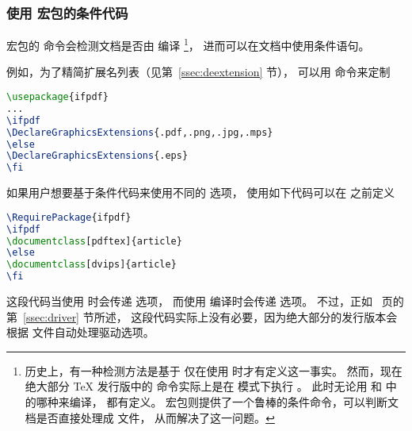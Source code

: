 \subsubsection{使用  宏包的条件代码}
 宏包的  命令会检测文档是否由  编译
\footnote{
	历史上，有一种检测方法是基于  仅在使用 \pdfLaTeX{} 时才有定义这一事实。
	然而，现在绝大部分 \TeX{} 发行版中的  命令实际上是在  模式下执行 \pdfLaTeX{}。
	此时无论用 和  中的哪种来编译， 都有定义。
	 宏包则提供了一个鲁棒的条件命令，可以判断文档是否直接处理成  文件，
	从而解决了这一问题。}，
进而可以在文档中使用条件语句。

例如，为了精简扩展名列表（见第~\ref{ssec:deextension} 节），
可以用  命令来定制
\begin{lstlisting}[language=LaTeX]
\usepackage{ifpdf}
...
\ifpdf
\DeclareGraphicsExtensions{.pdf,.png,.jpg,.mps}
\else
\DeclareGraphicsExtensions{.eps}
\fi
\end{lstlisting}

如果用户想要基于条件代码来使用不同的  选项，
使用如下代码可以在  之前定义 
\begin{lstlisting}[language=LaTeX]
\RequirePackage{ifpdf}
\ifpdf
\documentclass[pdftex]{article}
\else
\documentclass[dvips]{article}
\fi
\end{lstlisting}
这段代码当使用  时会传递  选项，
而使用  编译时会传递  选项。
不过，正如~\pageref{ssec:driver} 页的第~\ref{ssec:driver} 节所述，
这段代码实际上没有必要，因为绝大部分的发行版本会根据  文件自动处理驱动选项。


